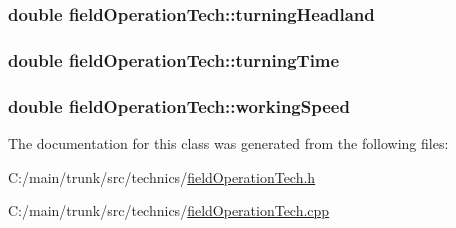 \label{classfield_operation_tech_ae917aae3110936d50cbd7ed3ea7c9ae1}
\hypertarget{classfield_operation_tech_a071eaea7399b6fc4e405735bf5b5ed0a}{
\subsubsection[{turningHeadland}]{\setlength{\rightskip}{0pt plus 5cm}double {\bf fieldOperationTech::turningHeadland}}}
\label{classfield_operation_tech_a071eaea7399b6fc4e405735bf5b5ed0a}
\hypertarget{classfield_operation_tech_aa0bcc31af0160f8615ff3c8b1d24c8c7}{
\subsubsection[{turningTime}]{\setlength{\rightskip}{0pt plus 5cm}double {\bf fieldOperationTech::turningTime}}}
\label{classfield_operation_tech_aa0bcc31af0160f8615ff3c8b1d24c8c7}
\hypertarget{classfield_operation_tech_a644ed10b38595f50750e1a2da1aa3447}{
\subsubsection[{workingSpeed}]{\setlength{\rightskip}{0pt plus 5cm}double {\bf fieldOperationTech::workingSpeed}}}
\label{classfield_operation_tech_a644ed10b38595f50750e1a2da1aa3447}


The documentation for this class was generated from the following files:\begin{DoxyCompactItemize}
\item 
C:/main/trunk/src/technics/\hyperlink{field_operation_tech_8h}{fieldOperationTech.h}\item 
C:/main/trunk/src/technics/\hyperlink{field_operation_tech_8cpp}{fieldOperationTech.cpp}\end{DoxyCompactItemize}
